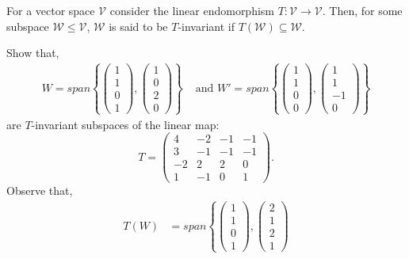 \begin{defn}
	For a vector space $\mathcal{V}$ consider the linear endomorphism
	$T: \mathcal{V} \to \mathcal{V}$. Then, for some subspace $\mathcal{W} \leq \mathcal{V}$,
	$\mathcal{W}$ is said to be $T$-invariant if $T(\mathcal{W}) \subseteq \mathcal{W}$.
\end{defn}

\begin{exmp}
	Show that,
	\begin{align*}
		W=span \left\{
			\begin{pmatrix}
				1\\1\\0\\1
			\end{pmatrix}
			,
			\begin{pmatrix}
				1\\0\\2\\0
			\end{pmatrix}
		\right\}
		& \text{ and }
		W'=span \left\{
			\begin{pmatrix}
				1\\1\\0\\0
			\end{pmatrix}
			,
			\begin{pmatrix}
				1\\1\\-1\\0
			\end{pmatrix}
		\right\}
	\end{align*}
	are $T$-invariant subspaces of the linear map:
	\[
		T=
		\begin{pmatrix}
			4 & -2 & -1 & -1 \\
			3 & -1 & -1 & -1 \\
			-2 & 2 & 2 & 0 \\
			1 & -1 & 0 & 1
		\end{pmatrix}.
	\]
	Observe that,
	\begin{align*}
		T(W) &= span \left\{
			\begin{pmatrix}
				1\\1\\0\\1
			\end{pmatrix}
			,
			\begin{pmatrix}
				2\\1\\2\\1

\end{pmatrix}
\end{align*}
\end{exmp}
